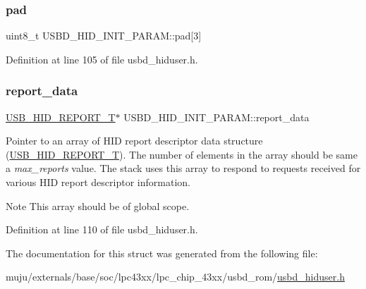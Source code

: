 \subsubsection{\texorpdfstring{pad}{pad}}
{\footnotesize\ttfamily uint8\+\_\+t U\+S\+B\+D\+\_\+\+H\+I\+D\+\_\+\+I\+N\+I\+T\+\_\+\+P\+A\+R\+A\+M\+::pad\mbox{[}3\mbox{]}}



Definition at line 105 of file usbd\+\_\+hiduser.\+h.

\mbox{\label{struct_u_s_b_d___h_i_d___i_n_i_t___p_a_r_a_m_a2e46476d82b7859a239feeadf457d0e8}} 
\subsubsection{\texorpdfstring{report\+\_\+data}{report\_data}}
{\footnotesize\ttfamily \hyperlink{group___u_s_b_d___h_i_d_gaaa1686adb431783ea4357e6899c0d39d}{U\+S\+B\+\_\+\+H\+I\+D\+\_\+\+R\+E\+P\+O\+R\+T\+\_\+T}$\ast$ U\+S\+B\+D\+\_\+\+H\+I\+D\+\_\+\+I\+N\+I\+T\+\_\+\+P\+A\+R\+A\+M\+::report\+\_\+data}

Pointer to an array of H\+ID report descriptor data structure (\hyperlink{group___u_s_b_d___h_i_d_gaaa1686adb431783ea4357e6899c0d39d}{U\+S\+B\+\_\+\+H\+I\+D\+\_\+\+R\+E\+P\+O\+R\+T\+\_\+T}). The number of elements in the array should be same a {\itshape max\+\_\+reports} value. The stack uses this array to respond to requests received for various H\+ID report descriptor information. \begin{DoxyNote}{Note}
This array should be of global scope. 
\end{DoxyNote}


Definition at line 110 of file usbd\+\_\+hiduser.\+h.



The documentation for this struct was generated from the following file\+:\begin{DoxyCompactItemize}
\item 
muju/externals/base/soc/lpc43xx/lpc\+\_\+chip\+\_\+43xx/usbd\+\_\+rom/\hyperlink{usbd__hiduser_8h}{usbd\+\_\+hiduser.\+h}\end{DoxyCompactItemize}
